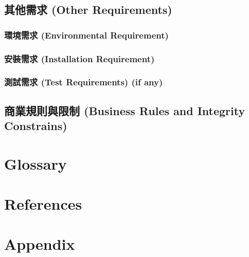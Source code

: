 \documentclass[a4paper, 12pt]{article}
\begin{document}
\subsection{其他需求 (Other Requirements)}
\subsubsection{環境需求 (Environmental Requirement)}
\subsubsection{安裝需求 (Installation Requirement)}
\subsubsection{測試需求 (Test Requirements) (if any)}
\subsection{商業規則與限制 (Business Rules and Integrity Constrains)}
\newpage

\section{Glossary}
\newpage

\section{References}
\printbibliography[heading=none]
\newpage

\section{Appendix}
\newpage
\end{document}
